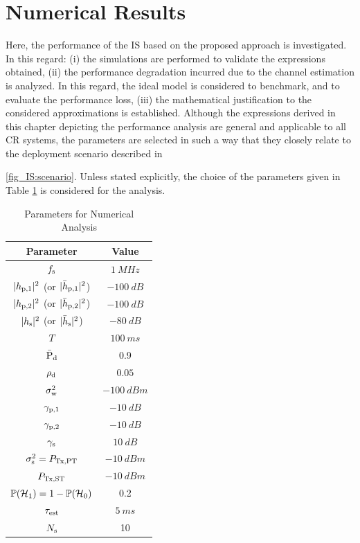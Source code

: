 \section{Numerical Results} \label{sec_IS:num_ana}
Here, the performance of the IS based on the proposed approach is investigated. In this regard: (i) the simulations are performed to validate the expressions obtained, (ii) the performance degradation incurred due to the channel estimation is analyzed. In this regard, the ideal model is considered to benchmark, and to evaluate the performance loss, (iii) the mathematical justification to the considered approximations is established. Although the expressions derived in this chapter depicting the performance analysis are general and applicable to all CR systems, the parameters are selected in such a way that they closely relate to the deployment scenario described in \figurename~{\ref{fig_IS:scenario}. Unless stated explicitly, the choice of the parameters given in Table \ref{tb_IS:tb2} is considered for the analysis. 
\begin{table}
\renewcommand{\arraystretch}{1.4}
\caption{Parameters for Numerical Analysis}
\label{tb_IS:tb2}
\centering
\begin{tabular}{c||c}
\hline
\bfseries Parameter & \bfseries Value \\
\hline\hline
$f_{\text{s}}$  & $\SI{1}{MHz}$ \\ %
$|h_{\text{p,1}}|^2$ (or $|\bar{h}_{\text{p,1}}|^2$)  & $\SI{-100}{dB}$ \\ %
$|h_{\text{p,2}}|^2$ (or $|\bar{h}_{\text{p,2}}|^2$) & $\SI{-100}{dB}$ \\ %
$|h_{\text{s}}|^2$ (or $|\bar{h}_{\text{s}}|^2$) & $\SI{-80}{dB}$ \\ %
$T$ & $\SI{100}{ms}$ \\ %
$\bar{\text{P}}_{\text{d}}$ & 0.9 \\ %
$\rho_{\text{d}}$ & $0.05$ \\ %
$\sigma^2_{\text{w}}$ & $\SI{-100}{dBm}$ \\ %
${\gamma}_{\text{p,1}}$ & $\SI{-10}{dB}$ \\ %
${\gamma}_{\text{p,2}}$ & $\SI{-10}{dB}$ \\ %
${\gamma}_{\text{s}}$ & $\SI{10}{dB}$ \\ %
$\sigma^2_{\text{s}} = P_{\text{Tx,PT}}$ & $-\SI{10}{dBm}$ \\ %
$P_{\text{Tx,ST}}$ & $-\SI{10}{dBm}$ \\ %
$\mathbb P(\mathcal{H}_1) = 1 - \mathbb P(\mathcal{H}_0)$ & 0.2 \\ %
$\tau_{\text{est}}$ & $\SI{5}{ms}$ \\ %
$N_{\text{s}}$ & 10 \\ \hline 
\end{tabular}
\end{table}
}
